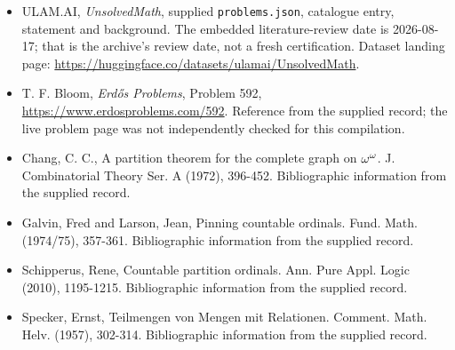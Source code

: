 \documentclass[11pt,a4paper]{article}
\begin{document}
{\small

\begin{itemize}

\item[\hypertarget{source:statement:1}{S1}] ULAM.AI, \emph{UnsolvedMath}, supplied \texttt{problems.json}, catalogue entry, statement and background. The embedded literature-review date is 2026-08-17; that is the archive’s review date, not a fresh certification. Dataset landing page: \url{https://huggingface.co/datasets/ulamai/UnsolvedMath}.

\item[\hypertarget{source:statement:2}{S2}] T. F. Bloom, \emph{Erdős Problems}, Problem 592, \url{https://www.erdosproblems.com/592}. Reference from the supplied record; the live problem page was not independently checked for this compilation.

\item[\hypertarget{source:statement:3}{S3}] Chang, C. C., A partition theorem for the complete graph on {$\omega\sp{\omega }$}. J. Combinatorial Theory Ser. A (1972), 396-452. Bibliographic information from the supplied record.

\item[\hypertarget{source:statement:4}{S4}] Galvin, Fred and Larson, Jean, Pinning countable ordinals. Fund. Math. (1974/75), 357-361. Bibliographic information from the supplied record.

\item[\hypertarget{source:statement:5}{S5}] Schipperus, Rene, Countable partition ordinals. Ann. Pure Appl. Logic (2010), 1195-1215. Bibliographic information from the supplied record.

\item[\hypertarget{source:statement:6}{S6}] Specker, Ernst, Teilmengen von Mengen mit Relationen. Comment. Math. Helv. (1957), 302-314. Bibliographic information from the supplied record.

\end{itemize}

}

\label{end:statement}
\end{document}
